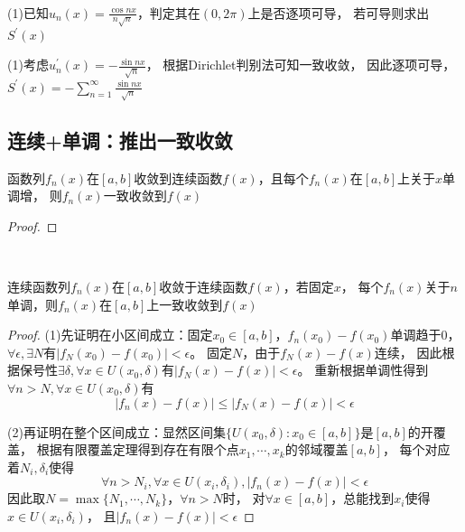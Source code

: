 ~

\begin{exercise}[具体计算]
  (1)已知$u_n(x) = \frac{\cos nx}{n \sqrt{n}}$，判定其在$(0,2\pi)$上是否逐项可导，
  若可导则求出$S^{\prime}(x)$
\end{exercise}

\begin{solution}
  (1)考虑$u_n^{\prime}(x) = - \frac{\sin nx}{\sqrt{n}}$，
  根据Dirichlet判别法可知一致收敛，
  因此逐项可导，
  $S^{\prime}(x) = -\sum\limits_{n = 1}^{\infty} \frac{\sin nx}{\sqrt{n}}$
\end{solution}



\subsection{连续+单调：推出一致收敛}

\begin{theorem}[关于$x$单调]
  函数列$f_n(x)$在$[a,b]$收敛到连续函数$f(x)$，且每个$f_n(x)$在$[a,b]$上关于$x$单调增，
  则$f_n(x)$一致收敛到$f(x)$
\end{theorem}

\begin{proof}
  
\end{proof}


~

\begin{theorem}[Dini定理：关于$n$单调]
  连续函数列$f_n(x)$在$[a,b]$收敛于连续函数$f(x)$，若固定$x$，
  每个$f_n(x)$关于$n$单调，则$f_n(x)$在$[a,b]$上一致收敛到$f(x)$
\end{theorem}

\begin{proof}
  (1)先证明在小区间成立：固定$x_0 \in [a,b]$，$f_n(x_0) - f(x_0)$单调趋于$0$，
  $\forall \epsilon, \exists N$有$|f_N(x_0) - f(x_0)| < \epsilon$。
  固定$N$，由于$f_N(x) - f(x)$连续，
  因此根据保号性$\exists \delta, \forall x \in U(x_0,\delta)$有$|f_N(x) - f(x)| < \epsilon$。
  重新根据单调性得到$\forall n > N, \forall x \in U(x_0,\delta)$有
  \begin{equation*}
    |f_n(x) - f(x)| \leq |f_N(x) - f(x)| < \epsilon
  \end{equation*}

  (2)再证明在整个区间成立：显然区间集$\{U(x_0,\delta): x_0 \in [a,b]\}$是$[a,b]$的开覆盖，
  根据有限覆盖定理得到存在有限个点$x_1,\cdots,x_k$的邻域覆盖$[a,b]$，
  每个对应着$N_i, \delta_i$使得
  \begin{equation*}
    \forall n > N_i, \forall x \in U(x_i,\delta_i), |f_n(x) - f(x)| < \epsilon
  \end{equation*}
  因此取$N = \max\{N_1,\cdots,N_k\}$，$\forall n > N$时，
  对$\forall x \in [a,b]$，总能找到$x_i$使得$x \in U(x_i,\delta_i)$，
  且$|f_n(x) - f(x)|<\epsilon$
\end{proof}

